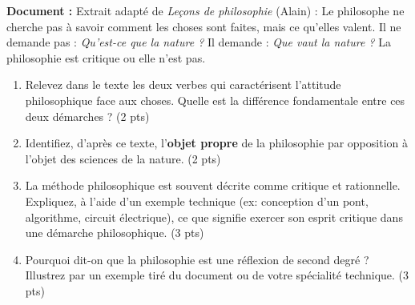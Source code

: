 \documentclass[11pt]{article}
\begin{document}
\begin{exercice}
\textbf{Document :} Extrait adapté de \textit{Leçons de philosophie} (Alain) : \og{}Le philosophe ne cherche pas à savoir comment les choses sont faites, mais ce qu'elles valent. Il ne demande pas : \textit{Qu'est-ce que la nature ?} Il demande : \textit{Que vaut la nature ?} La philosophie est critique ou elle n'est pas.\fg{}

\begin{enumerate}
    \item Relevez dans le texte les deux verbes qui caractérisent l'attitude philosophique face aux choses. Quelle est la différence fondamentale entre ces deux démarches ? (2 pts)
    \item Identifiez, d'après ce texte, l'\textbf{objet propre} de la philosophie par opposition à l'objet des sciences de la nature. (2 pts)
    \item La méthode philosophique est souvent décrite comme \og{}critique\fg{} et \og{}rationnelle\fg{}. Expliquez, à l'aide d'un exemple technique (ex: conception d'un pont, algorithme, circuit électrique), ce que signifie \og{}exercer son esprit critique\fg{} dans une démarche philosophique. (3 pts)
    \item Pourquoi dit-on que la philosophie est une \og{}réflexion de second degré\fg{} ? Illustrez par un exemple tiré du document ou de votre spécialité technique. (3 pts)
\end{enumerate}
\end{exercice}
\end{document}
